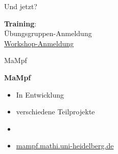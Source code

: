 \begin{frame}{Und jetzt?}
    \begin{center}
            \huge{\textbf{Training}}:\\
            \vspace{1em}
			\huge{Übungsgruppen-Anmeldung}\\
			\pause\huge{\href{https://mathphys.fsk.uni-heidelberg.de/vorkurs/workshops}{Workshop-Anmeldung}}
    \end{center}
\end{frame}

\begin{frame}{MaMpf}
    \begin{center}
        \vfill
        \huge{\textbf{MaMpf}}\\\normalsize
	\begin{itemize}
		\item In Entwicklung
		\item verschiedene Teilprojekte
		\item[]
		\item \href{https://mampf.mathi.uni-heidelberg.de/}{mampf.mathi.uni-heidelberg.de}
	\end{itemize}
        \vfill
    \end{center}
\end{frame}

